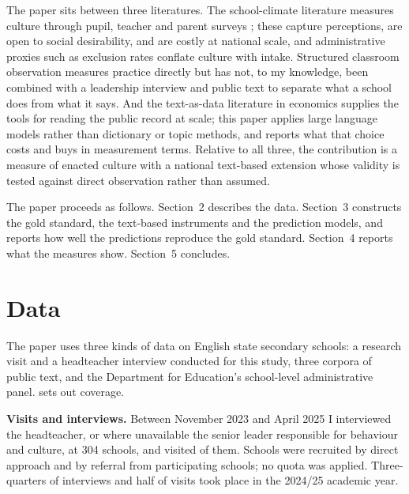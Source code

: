 The paper sits between three literatures. The school-climate literature
measures culture through pupil, teacher and parent surveys
\citep{hoy2001,cohen2009,thapa2013}; these capture perceptions, are open to
social desirability, and are costly at national scale, and administrative
proxies such as exclusion rates \citep{machin2020} conflate culture with
intake. Structured classroom observation \citep{hamre2007} measures practice
directly but has not, to my knowledge, been combined with a leadership
interview and public text to separate what a school does from what it says.
And the text-as-data literature in economics \citep{gentzkow2019} supplies
the tools for reading the public record at scale; this paper applies large
language models rather than dictionary or topic methods, and reports what
that choice costs and buys in measurement terms. Relative to all three, the
contribution is a measure of enacted culture with a national text-based
extension whose validity is tested against direct observation rather than
assumed.

The paper proceeds as follows. Section~2 describes the data. Section~3
constructs the gold standard, the text-based instruments and the prediction
models, and reports how well the predictions reproduce the gold standard.
Section~4 reports what the measures show. Section~5 concludes.

\section{Data}
\label{sec:p1_data}

The paper uses three kinds of data on English state secondary schools: a
research visit and a headteacher interview conducted for this study, three
corpora of public text, and the Department for Education's school-level
administrative panel.  sets out coverage.

\textbf{Visits and interviews.} Between November 2023 and April 2025 I
interviewed the headteacher, or where unavailable the senior leader
responsible for behaviour and culture, at 304 schools, and visited
\NTierOne{} of them. Schools were recruited by direct approach and by
referral from participating schools; no quota was applied. Three-quarters of
interviews and half of visits took place in the 2024/25 academic year.

